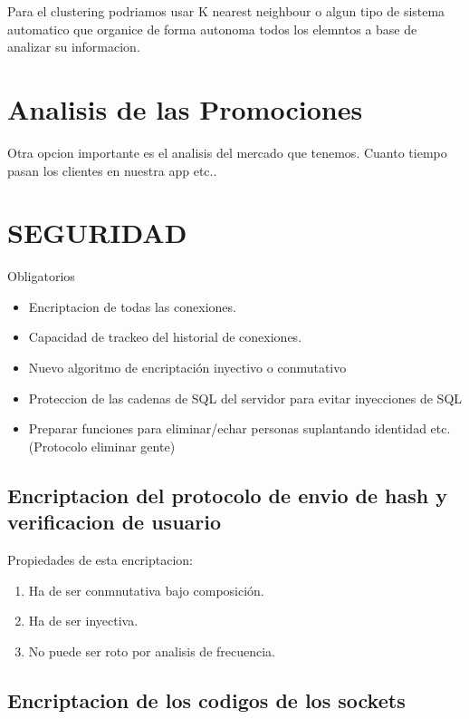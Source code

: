 \documentclass{article}
\theoremstyle{definition}
\begin{document}
Para el clustering podriamos usar K nearest neighbour o algun tipo de sistema automatico que organice de forma autonoma todos los elemntos a base de analizar su informacion.

\section{Analisis de las Promociones}

Otra opcion importante es el analisis del mercado que tenemos. Cuanto tiempo pasan los clientes en nuestra app etc..


\section{SEGURIDAD}

Obligatorios

\begin{itemize}
    \item Encriptacion de todas las conexiones.
    \item Capacidad de trackeo del historial de conexiones.
    \item Nuevo algoritmo de encriptación inyectivo o conmutativo
    \item Proteccion de las cadenas de SQL del servidor para evitar inyecciones de SQL
    \item ‌Preparar funciones para eliminar/echar personas suplantando identidad etc. (Protocolo eliminar gente)
    
\end{itemize}

\subsection{Encriptacion del protocolo de envio de hash y verificacion de usuario}

Propiedades de esta encriptacion:
\begin{enumerate}
\item Ha de ser conmnutativa bajo composición.
\item Ha de ser inyectiva.
\item No puede ser roto por analisis de frecuencia.
\end{enumerate}

\subsection{Encriptacion de los codigos de los sockets}
\end{document}
